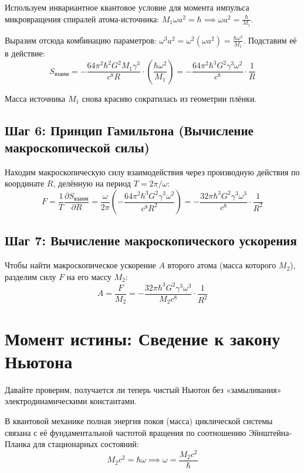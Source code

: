 \documentclass[12pt,a4paper]{article}
\begin{document}
Используем инвариантное квантовое условие для момента импульса микровращения спиралей атома-источника: $M_1 \omega a^2 = \hbar \implies \omega a^2 = \frac{\hbar}{M_1}$.

Выразим отсюда комбинацию параметров: $\omega^3 a^2 = \omega^2 (\omega a^2) = \frac{\hbar \omega^2}{M_1}$. Подставим её в действие:
\begin{equation}
S_{взаим} = - \frac{64 \pi^2 \hbar^2 G^2 M_1 \gamma^3}{c^8 R} \cdot \left( \frac{\hbar \omega^2}{M_1} \right) = - \frac{64 \pi^2 \hbar^3 G^2 \gamma^3 \omega^2}{c^8} \cdot \frac{1}{R}
\end{equation}

Масса источника $M_1$ снова красиво сократилась из геометрии плёнки.

\subsection*{Шаг 6: Принцип Гамильтона (Вычисление макроскопической силы)}

Находим макроскопическую силу взаимодействия через производную действия по координате $R$, делённую на период $T = 2\pi/\omega$:
\begin{equation}
F = \frac{1}{T} \frac{\partial S_{взаим}}{\partial R} = \frac{\omega}{2\pi} \left( - \frac{64 \pi^2 \hbar^3 G^2 \gamma^3 \omega^2}{c^8 R^2} \right) = - \frac{32\pi \hbar^3 G^2 \gamma^3 \omega^3}{c^8} \cdot \frac{1}{R^2}
\end{equation}

\subsection*{Шаг 7: Вычисление макроскопического ускорения}

Чтобы найти макроскопическое ускорение $A$ второго атома (масса которого $M_2$), разделим силу $F$ на его массу $M_2$:
\begin{equation}
A = \frac{F}{M_2} = - \frac{32\pi \hbar^3 G^2 \gamma^3 \omega^3}{M_2 c^8} \cdot \frac{1}{R^2}
\end{equation}

\section*{Момент истины: Сведение к закону Ньютона}

Давайте проверим, получается ли теперь чистый Ньютон без «замыливания» электродинамическими константами.

В квантовой механике полная энергия покоя (масса) циклической системы связана с её фундаментальной частотой вращения по соотношению Эйнштейна-Планка для стационарных состояний:
\begin{equation}
M_2 c^2 = \hbar \omega \implies \omega = \frac{M_2 c^2}{\hbar}
\end{equation}
\end{document}
